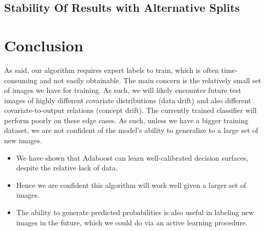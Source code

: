 \documentclass[11pt, letterpaper, journal]{IEEEtran}
\begin{document}
\subsection{Stability Of Results with Alternative Splits}

\section{Conclusion}
As said, our algorithm requires expert labels to train, which is often time-consuming and not easily obtainable. The main concern is the relatively small set of images we have for training. As such, we will likely encounter future test images of highly different covariate distributions (data drift) and also different covariate-to-output relations (concept drift). The currently trained classifier will perform poorly on these edge cases. As such, unless we have a bigger training dataset, we are not confident of the model's ability to generalize to a large set of new images.
\begin{itemize}
    \item We have shown that Adaboost can learn well-calibrated decision surfaces, despite the relative lack of data.
    \item Hence we are confident this algorithm will work well given a larger set of images.
    \item The ability to generate predicted probabilities is also useful in labeling new images in the future, which we could do via an active learning procedure.
\end{itemize}
\end{document}
